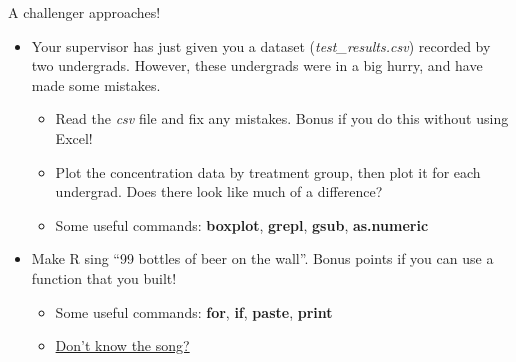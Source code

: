 \documentclass[
  ignorenonframetext,
  aspectratio=169]{beamer}
\begin{document}
\begin{frame}{A challenger approaches!}
\protect\hypertarget{a-challenger-approaches}{}
\begin{itemize}[<+->]
\item
  Your supervisor has just given you a dataset
  (\emph{test\_results.csv}) recorded by two undergrads. However, these
  undergrads were in a big hurry, and have made some mistakes.

  \begin{itemize}[<+->]
  \item
    Read the \emph{csv} file and fix any mistakes. Bonus if you do this
    without using Excel!
  \item
    Plot the concentration data by treatment group, then plot it for
    each undergrad. Does there look like much of a difference?
  \item
    Some useful commands: \textbf{boxplot}, \textbf{grepl},
    \textbf{gsub}, \textbf{as.numeric}
  \end{itemize}
\item
  Make R sing ``99 bottles of beer on the wall''. Bonus points if you
  can use a function that you built!

  \begin{itemize}[<+->]
  \item
    Some useful commands: \textbf{for}, \textbf{if}, \textbf{paste},
    \textbf{print}
  \item
    \href{https://en.wikipedia.org/wiki/99_Bottles_of_Beer}{Don't know
    the song?}
  \end{itemize}
\end{itemize}
\end{frame}
\end{document}
